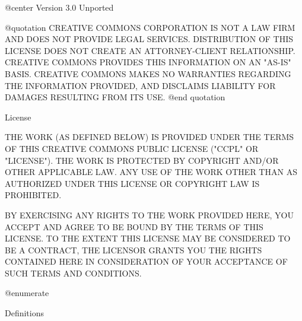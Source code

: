 @center Version 3.0 Unported

@quotation
CREATIVE COMMONS CORPORATION IS NOT A LAW FIRM AND DOES NOT PROVIDE LEGAL SERVICES. DISTRIBUTION OF THIS LICENSE DOES NOT CREATE AN ATTORNEY-CLIENT RELATIONSHIP. CREATIVE COMMONS PROVIDES THIS INFORMATION ON AN "AS-IS" BASIS. CREATIVE COMMONS MAKES NO WARRANTIES REGARDING THE INFORMATION PROVIDED, AND DISCLAIMS LIABILITY FOR DAMAGES RESULTING FROM ITS USE.
@end quotation

License

THE WORK (AS DEFINED BELOW) IS PROVIDED UNDER THE TERMS OF THIS CREATIVE COMMONS PUBLIC LICENSE ("CCPL" OR "LICENSE"). THE WORK IS PROTECTED BY COPYRIGHT AND/OR OTHER APPLICABLE LAW. ANY USE OF THE WORK OTHER THAN AS AUTHORIZED UNDER THIS LICENSE OR COPYRIGHT LAW IS PROHIBITED.

BY EXERCISING ANY RIGHTS TO THE WORK PROVIDED HERE, YOU ACCEPT AND AGREE TO BE BOUND BY THE TERMS OF THIS LICENSE. TO THE EXTENT THIS LICENSE MAY BE CONSIDERED TO BE A CONTRACT, THE LICENSOR GRANTS YOU THE RIGHTS CONTAINED HERE IN CONSIDERATION OF YOUR ACCEPTANCE OF SUCH TERMS AND CONDITIONS.

@enumerate
\item
Definitions


